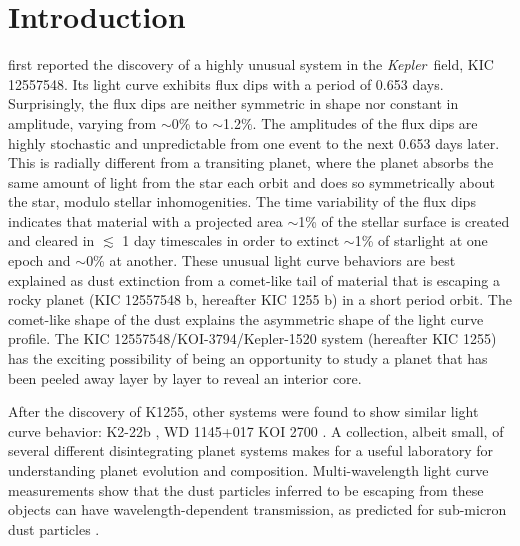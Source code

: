 \documentclass[preprint,trackchanges]{aastex61}
\newcommand{\sha}{KIC 1255 b}
\newcommand{\shStar}{KIC 1255}
\newcommand{\kepler}{{\it Kepler}}
\begin{document}



\section{Introduction}\label{sec:Intro}
\citet{rappaport} first reported the discovery of a highly unusual system in the \kepler\ field, KIC 12557548.
Its light curve exhibits flux dips with a period of 0.653 days.
Surprisingly, the flux dips are neither symmetric in shape nor constant in amplitude, varying from $\sim$0\% to $\sim$1.2\%.
The amplitudes of the flux dips are highly stochastic and unpredictable from one event to the next 0.653 days later.
This is radially different from a transiting planet, where the planet absorbs the same amount of light from the star each orbit and does so symmetrically about the star, modulo stellar inhomogenities.
The time variability of the flux dips indicates that material with a projected area $\sim$1\% of the stellar surface is created and cleared in $\lesssim$ 1 day timescales in order to extinct $\sim$1\% of starlight at one epoch and $\sim$0\% at another.
These unusual light curve behaviors are best explained as dust extinction from a comet-like tail of material that is escaping a rocky planet (KIC 12557548 b, hereafter \sha) in a short period orbit.
The comet-like shape of the dust explains the asymmetric shape of the light curve profile.
The KIC 12557548/KOI-3794/Kepler-1520 system (hereafter \shStar) has the exciting possibility of being an opportunity to study a planet that has been peeled away layer by layer to reveal an interior core.

After the discovery of K1255, other systems were found to show similar light curve behavior: K2-22b \citep{sanchis-ojedak2-22}, WD 1145+017 \citep{vanderburg2015wdDisintegrating}  KOI 2700 \citep{rappaport2014KOI2700} .
A collection, albeit small, of several different disintegrating planet systems makes for a useful laboratory for understanding planet evolution and composition.
Multi-wavelength light curve measurements show that the dust particles inferred to be escaping from these objects can have wavelength-dependent transmission, as predicted for sub-micron dust particles \citep{bochinski2015evolving,sanchis-ojedak2-22}.
\end{document}
